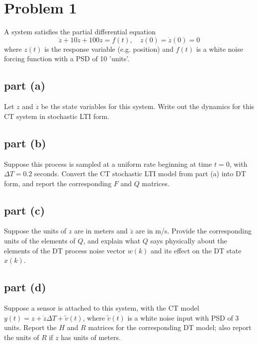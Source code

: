 \documentclass[11pt]{article}
\begin{document}
\thispagestyle{empty}

\newlength{\boxlength}\setlength{\boxlength}{\textwidth}
\addtolength{\boxlength}{-4mm}

\begin{center}
\end{center}

\section*{Problem 1}
A system satisfies the partial differential equation
\begin{equation*}
	\ddot{z}+10\dot{z}+100z=f(t), \quad z(0)=\dot{z}(0)=0
\end{equation*}
where $z(t)$ is the response variable (e.g. position) and $f(t)$ is a white noise forcing function with a PSD of 10 'units'.

\subsection*{part (a)}
Let $z$ and $\dot{z}$ be the state variables for this system. Write out the dynamics for this CT system in stochastic LTI form.

\subsection*{part (b)}
Suppose this process is sampled at a uniform rate beginning at time $t=0$, with $\Delta T=0.2$ seconds. Convert the CT stochastic LTI model from part (a) into DT form, and report the corresponding $F$ and $Q$ matrices.

\subsection*{part (c)}
Suppose the units of $z$ are in meters and $\dot{z}$ are in m/s. Provide the corresponding units of the elements of $Q$, and explain what $Q$ says physically about the elements of the DT process noise vector $w(k)$ and its effect on the DT state $x(k)$.

\subsection*{part (d)}
Suppose a sensor is attached to this system, with the CT model $y(t)=z+\dot{z}\Delta T+\tilde{v}(t)$, where $\tilde{v}(t)$ is a white noise input with PSD of 3 units. Report the $H$ and $R$ matrices for the corresponding DT model; also report the units of $R$ if $z$ has units of meters.
\end{document}
